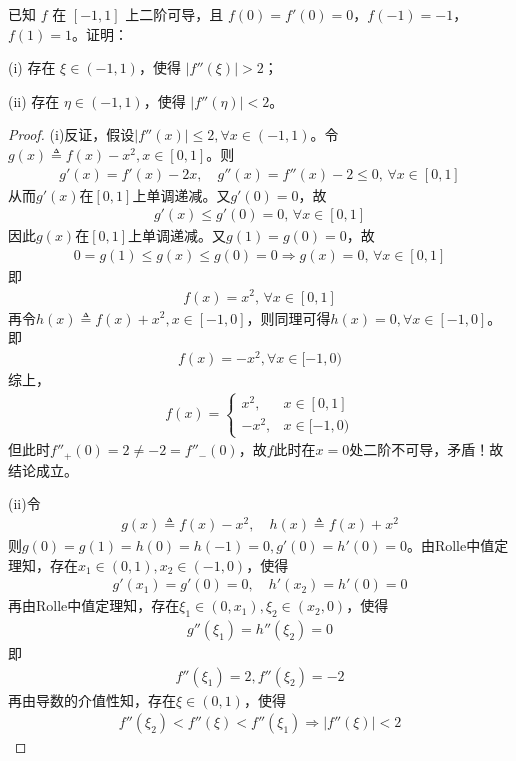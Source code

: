 \documentclass[../../main.tex]{subfiles}%
\begin{document}
\begin{example}
已知 $f$ 在 $[-1,1]$ 上二阶可导，且 $f(0) = f'(0) = 0$，$f(-1) = -1$，$f(1) = 1$。证明：

(i) 存在 $\xi \in (-1,1)$，使得 $|f''(\xi)| > 2$；

(ii) 存在 $\eta \in (-1,1)$，使得 $|f''(\eta)| < 2$。
\end{example}
\begin{proof}
(i)反证，假设$| f''(x) | \leqslant 2, \forall x \in (-1,1)$。令$g(x) \triangleq f(x) - x^2, x \in [0,1]$。则
\begin{align*}
g'(x) = f'(x) - 2x, \quad g''(x) = f''(x) - 2 \leqslant 0, \, \forall x \in [0,1]
\end{align*}
从而$g'(x)$在$[0,1]$上单调递减。又$g'(0) = 0$，故
\begin{align*}
g'(x) \leqslant g'(0) = 0, \, \forall x \in [0,1]
\end{align*}
因此$g(x)$在$[0,1]$上单调递减。又$g(1) = g(0) = 0$，故
\begin{align*}
0 = g(1) \leqslant g(x) \leqslant g(0) = 0 \Longrightarrow g(x) = 0, \, \forall x \in [0,1]
\end{align*}
即
\begin{align*}
f(x) = x^2, \, \forall x \in [0,1]
\end{align*}
再令$h(x) \triangleq f(x) + x^2, x \in [-1,0]$，则同理可得$h(x) = 0, \forall x \in [-1,0]$。即
\begin{align*}
f(x) = -x^2, \forall x \in [-1,0)
\end{align*}
综上，
\begin{align*}
f(x) = \begin{cases} 
x^2, & x \in [0,1] \\
-x^2, & x \in [-1,0)
\end{cases}
\end{align*}
但此时$f''_+(0) = 2 \ne -2 = f''_-(0)$，故$f$此时在$x=0$处二阶不可导，矛盾！故结论成立。

(ii)令
\begin{align*}
g(x) \triangleq f(x) - x^2, \quad h(x) \triangleq f(x) + x^2
\end{align*}
则$g(0) = g(1) = h(0) = h(-1) = 0, g'(0) = h'(0) = 0$。由Rolle中值定理知，存在$x_1 \in (0,1), x_2 \in (-1,0)$，使得
\begin{align*}
g'(x_1) = g'(0) = 0, \quad h'(x_2) = h'(0) = 0
\end{align*}
再由Rolle中值定理知，存在$\xi_1 \in (0, x_1), \xi_2 \in (x_2, 0)$，使得
\begin{align*}
g''(\xi_1) = h''(\xi_2) = 0
\end{align*}
即
\begin{align*}
f''(\xi_1) = 2, f''(\xi_2) = -2
\end{align*}
再由导数的介值性知，存在$\xi \in (0,1)$，使得
\begin{align*}
f''(\xi_2) < f''(\xi) < f''(\xi_1) \Longrightarrow | f''(\xi) | < 2
\end{align*}
\end{proof}
\end{document}
